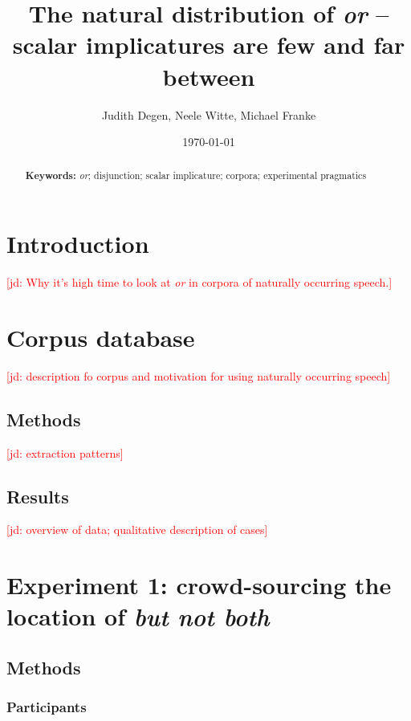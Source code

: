 \documentclass[11pt,letterpaper]{article}
\title{The natural distribution of \emph{or} -- scalar implicatures are few and far between}
\author{Judith Degen, Neele Witte, Michael Franke}
\date\today
\newcommand{\jd}[1]{\textcolor{Red}{[jd: #1]}}
\begin{document}
\maketitle


\begin{abstract}


\textbf{Keywords:} 
\emph{or}; disjunction; scalar implicature; corpora; experimental pragmatics
\end{abstract}


\section{Introduction}

\jd{Why it's high time to look at \emph{or} in corpora of naturally occurring speech.}

\cite{degen2015}

\section{Corpus database}
\label{sec:database}

\jd{description fo corpus and motivation for using naturally occurring speech}

\subsection{Methods}

\jd{extraction patterns}

\subsection{Results}

\jd{overview of data; qualitative description of cases}


\section{Experiment 1: crowd-sourcing the location of \emph{but not both}}


\subsection{Methods}

\subsubsection{Participants}
\end{document}
